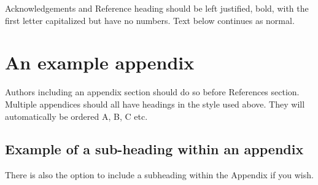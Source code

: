 \documentclass[5p,times,procedia]{Definitions/elsarticle}
\begin{document}
Acknowledgements and Reference heading should be left justified, bold, with the first letter capitalized but have no numbers. Text below continues as normal.



\appendix
\section{An example appendix}
Authors including an appendix section should do so before References section. Multiple appendices should all have headings in the style used above. They will automatically be ordered A, B, C etc.

\subsection{Example of a sub-heading within an appendix}
There is also the option to include a subheading within the Appendix if you wish.


%
%



\end{document}

